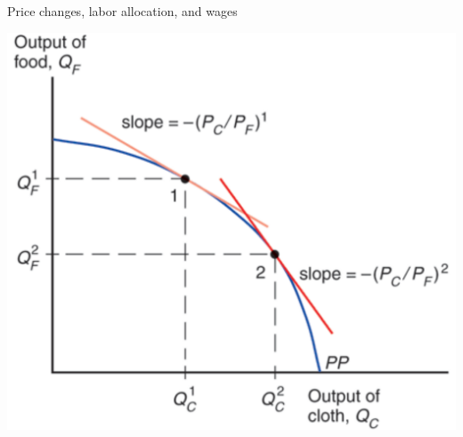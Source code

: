 \documentclass[ignorenonframetext,]{beamer}
\begin{document}
\begin{frame}{Price changes, labor allocation, and wages}

    \includegraphics[scale=0.25]{rel_price_ppf.png}

\end{frame}
\end{document}
